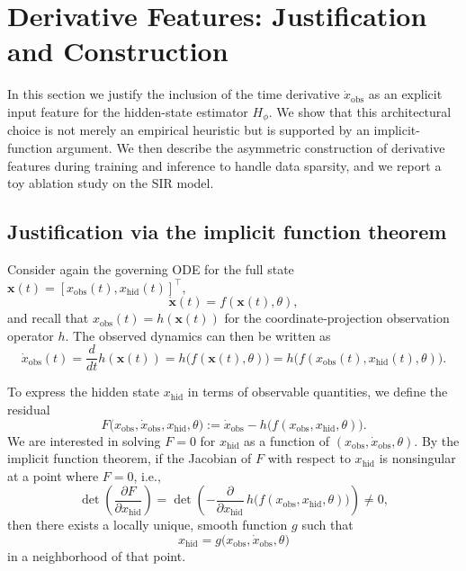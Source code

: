 \section{Derivative Features: Justification and Construction}
\label{sec:derivative}


In this section we justify the inclusion of the time derivative $\dot{x}_{\mathrm{obs}}$ as an explicit input feature for the hidden-state estimator $H_\phi$.
We show that this architectural choice is not merely an empirical heuristic but is supported by an implicit-function argument.
We then describe the asymmetric construction of derivative features during training and inference to handle data sparsity, and we report
a toy ablation study on the SIR model.

\subsection{Justification via the implicit function theorem}
\label{subsec:derivative-justification}

Consider again the governing ODE for the full state $\mathbf{x}(t)=[x_{\mathrm{obs}}(t),x_{\mathrm{hid}}(t)]^\top$,
\[
\dot{\mathbf{x}}(t) = f(\mathbf{x}(t),\theta),
\]
and recall that $x_{\mathrm{obs}}(t)=h(\mathbf{x}(t))$ for the coordinate-projection observation operator $h$.
The observed dynamics can then be written as
\begin{equation}
\label{eq:obs-ode}
\dot{x}_{\mathrm{obs}}(t)
=
\frac{d}{dt}h(\mathbf{x}(t))
=
h\bigl(f(\mathbf{x}(t),\theta)\bigr)
=
h\bigl(f(x_{\mathrm{obs}}(t),x_{\mathrm{hid}}(t),\theta)\bigr).
\end{equation}

To express the hidden state $x_{\mathrm{hid}}$ in terms of observable quantities, we define the residual
\begin{equation}
\label{eq:residual}
F\bigl(x_{\mathrm{obs}},\dot{x}_{\mathrm{obs}},x_{\mathrm{hid}},\theta\bigr)
:=
\dot{x}_{\mathrm{obs}}
-
h\bigl(f(x_{\mathrm{obs}},x_{\mathrm{hid}},\theta)\bigr).
\end{equation}
We are interested in solving $F=0$ for $x_{\mathrm{hid}}$ as a function of $(x_{\mathrm{obs}},\dot{x}_{\mathrm{obs}},\theta)$.
By the implicit function theorem, if the Jacobian of $F$ with respect to $x_{\mathrm{hid}}$ is nonsingular at a point where $F=0$, i.e.,
\begin{equation}
\label{eq:jacobian-deriv}
\det\left(\frac{\partial F}{\partial x_{\mathrm{hid}}}\right)
=
\det\left(-\frac{\partial}{\partial x_{\mathrm{hid}}}\, h\bigl(f(x_{\mathrm{obs}},x_{\mathrm{hid}},\theta)\bigr)\right)
\neq 0,
\end{equation}
then there exists a locally unique, smooth function $g$ such that
\begin{equation}
\label{eq:IFT-repr}
x_{\mathrm{hid}} = g\bigl(x_{\mathrm{obs}},\dot{x}_{\mathrm{obs}},\theta\bigr)
\end{equation}
in a neighborhood of that point.

